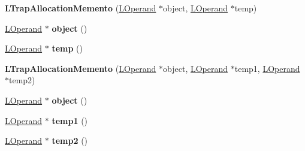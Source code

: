 \begin{DoxyCompactItemize}
\item 
{\bfseries L\+Trap\+Allocation\+Memento} (\hyperlink{classv8_1_1internal_1_1_l_operand}{L\+Operand} $\ast$object, \hyperlink{classv8_1_1internal_1_1_l_operand}{L\+Operand} $\ast$temp)\hypertarget{classv8_1_1internal_1_1_l_trap_allocation_memento_ac6bcdec1f1e7643e817440c9c13e4a81}{}\label{classv8_1_1internal_1_1_l_trap_allocation_memento_ac6bcdec1f1e7643e817440c9c13e4a81}

\item 
\hyperlink{classv8_1_1internal_1_1_l_operand}{L\+Operand} $\ast$ {\bfseries object} ()\hypertarget{classv8_1_1internal_1_1_l_trap_allocation_memento_a8cf93b74c7f72372724621e5c5cfeb06}{}\label{classv8_1_1internal_1_1_l_trap_allocation_memento_a8cf93b74c7f72372724621e5c5cfeb06}

\item 
\hyperlink{classv8_1_1internal_1_1_l_operand}{L\+Operand} $\ast$ {\bfseries temp} ()\hypertarget{classv8_1_1internal_1_1_l_trap_allocation_memento_ac4ad07a7d7d3bf7ca3285e47cbaed844}{}\label{classv8_1_1internal_1_1_l_trap_allocation_memento_ac4ad07a7d7d3bf7ca3285e47cbaed844}

\item 
{\bfseries L\+Trap\+Allocation\+Memento} (\hyperlink{classv8_1_1internal_1_1_l_operand}{L\+Operand} $\ast$object, \hyperlink{classv8_1_1internal_1_1_l_operand}{L\+Operand} $\ast$temp1, \hyperlink{classv8_1_1internal_1_1_l_operand}{L\+Operand} $\ast$temp2)\hypertarget{classv8_1_1internal_1_1_l_trap_allocation_memento_af868ce1954e680022b888601b23cfd3c}{}\label{classv8_1_1internal_1_1_l_trap_allocation_memento_af868ce1954e680022b888601b23cfd3c}

\item 
\hyperlink{classv8_1_1internal_1_1_l_operand}{L\+Operand} $\ast$ {\bfseries object} ()\hypertarget{classv8_1_1internal_1_1_l_trap_allocation_memento_a8cf93b74c7f72372724621e5c5cfeb06}{}\label{classv8_1_1internal_1_1_l_trap_allocation_memento_a8cf93b74c7f72372724621e5c5cfeb06}

\item 
\hyperlink{classv8_1_1internal_1_1_l_operand}{L\+Operand} $\ast$ {\bfseries temp1} ()\hypertarget{classv8_1_1internal_1_1_l_trap_allocation_memento_a51d584ab8772f64908e948bc583e89aa}{}\label{classv8_1_1internal_1_1_l_trap_allocation_memento_a51d584ab8772f64908e948bc583e89aa}

\item 
\hyperlink{classv8_1_1internal_1_1_l_operand}{L\+Operand} $\ast$ {\bfseries temp2} ()\hypertarget{classv8_1_1internal_1_1_l_trap_allocation_memento_aeb20addf490cae6ab74bf01d5073a8bd}{}\label{classv8_1_1internal_1_1_l_trap_allocation_memento_aeb20addf490cae6ab74bf01d5073a8bd}


\end{DoxyCompactItemize}
